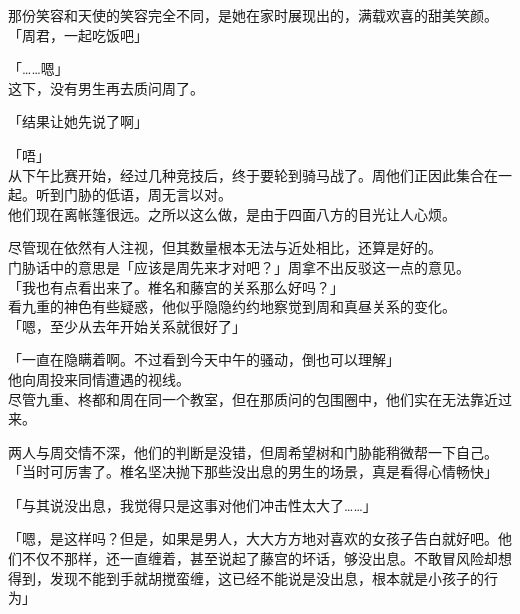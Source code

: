 那份笑容和天使的笑容完全不同，是她在家时展现出的，满载欢喜的甜美笑颜。\\

「周君，一起吃饭吧」

「……嗯」\\

这下，没有男生再去质问周了。\\

\vspace{2\baselineskip}

「结果让她先说了啊」

「唔」\\

从下午比赛开始，经过几种竞技后，终于要轮到骑马战了。周他们正因此集合在一起。听到门胁的低语，周无言以对。\\

他们现在离帐篷很远。之所以这么做，是由于四面八方的目光让人心烦。

尽管现在依然有人注视，但其数量根本无法与近处相比，还算是好的。\\

门胁话中的意思是「应该是周先来才对吧？」周拿不出反驳这一点的意见。\\

「我也有点看出来了。椎名和藤宫的关系那么好吗？」\\

看九重的神色有些疑惑，他似乎隐隐约约地察觉到周和真昼关系的变化。\\

「嗯，至少从去年开始关系就很好了」

「一直在隐瞒着啊。不过看到今天中午的骚动，倒也可以理解」\\

他向周投来同情遭遇的视线。\\

尽管九重、柊都和周在同一个教室，但在那质问的包围圈中，他们实在无法靠近过来。

两人与周交情不深，他们的判断是没错，但周希望树和门胁能稍微帮一下自己。\\

「当时可厉害了。椎名坚决抛下那些没出息的男生的场景，真是看得心情畅快」

「与其说没出息，我觉得只是这事对他们冲击性太大了……」

「嗯，是这样吗？但是，如果是男人，大大方方地对喜欢的女孩子告白就好吧。他们不仅不那样，还一直缠着，甚至说起了藤宫的坏话，够没出息。不敢冒风险却想得到，发现不能到手就胡搅蛮缠，这已经不能说是没出息，根本就是小孩子的行为」

